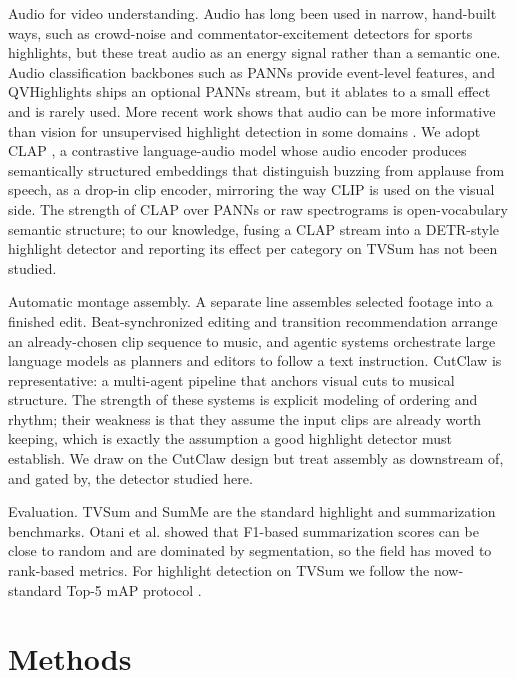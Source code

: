 \documentclass[10pt,twocolumn,letterpaper]{article}
\begin{document}
Audio for video understanding. Audio has long been used in narrow, hand-built ways, such as crowd-noise and commentator-excitement detectors for sports highlights, but these treat audio as an energy signal rather than a semantic one. Audio classification backbones such as PANNs \cite{panns} provide event-level features, and QVHighlights ships an optional PANNs stream, but it ablates to a small effect and is rarely used. More recent work shows that audio can be more informative than vision for unsupervised highlight detection in some domains \cite{recurrence}. We adopt CLAP \cite{clap,laionclap}, a contrastive language-audio model whose audio encoder produces semantically structured embeddings that distinguish buzzing from applause from speech, as a drop-in clip encoder, mirroring the way CLIP is used on the visual side. The strength of CLAP over PANNs or raw spectrograms is open-vocabulary semantic structure; to our knowledge, fusing a CLAP stream into a DETR-style highlight detector and reporting its effect per category on TVSum has not been studied.

Automatic montage assembly. A separate line assembles selected footage into a finished edit. Beat-synchronized editing and transition recommendation arrange an already-chosen clip sequence to music, and agentic systems orchestrate large language models as planners and editors to follow a text instruction. CutClaw \cite{cutclaw} is representative: a multi-agent pipeline that anchors visual cuts to musical structure. The strength of these systems is explicit modeling of ordering and rhythm; their weakness is that they assume the input clips are already worth keeping, which is exactly the assumption a good highlight detector must establish. We draw on the CutClaw design but treat assembly as downstream of, and gated by, the detector studied here.

Evaluation. TVSum \cite{tvsum} and SumMe \cite{summe} are the standard highlight and summarization benchmarks. Otani et al. \cite{otani} showed that F1-based summarization scores can be close to random and are dominated by segmentation, so the field has moved to rank-based metrics. For highlight detection on TVSum we follow the now-standard Top-5 mAP protocol \cite{momentdetr}.

\section{Methods}
\end{document}
